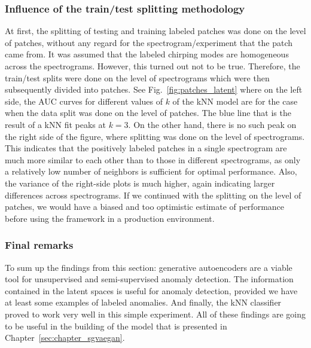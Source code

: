 \subsubsection{Influence of the train/test splitting methodology} \label{sec:alfven_splits}
At first, the splitting of testing and training labeled patches was done on the level of patches, without any regard for the spectrogram/experiment that the patch came from. It was assumed that the labeled chirping modes are homogeneous across the spectrograms. However, this turned out not to be true. Therefore, the train/test splits were done on the level of spectrograms which were then subsequently divided into patches. See Fig.~\ref{fig:patches_latent} where on the left side, the AUC curves for different values of $k$ of the kNN model are for the case when the data split was done on the level of patches. The blue line that is the result of a kNN fit peaks at $k=3$. On the other hand, there is no such peak on the right side of the figure, where splitting was done on the level of spectrograms. This indicates that the positively labeled patches in a single spectrogram are much more similar to each other than to those in different spectrograms, as only a relatively low number of neighbors is sufficient for optimal performance. Also, the variance of the right-side plots is much higher, again indicating larger differences across spectrograms. If we continued with the splitting on the level of patches, we would have a biased and too optimistic estimate of performance before using the framework in a production environment.

\subsubsection{Final remarks}
To sum up the findings from this section: generative autoencoders are a viable tool for unsupervised and semi-supervised anomaly detection. The information contained in the latent spaces is useful for anomaly detection, provided we have at least some examples of labeled anomalies. And finally, the kNN classifier proved to work very well in this simple experiment. All of these findings are going to be useful in the building of the model that is presented in Chapter~\ref{sec:chapter_sgvaegan}. 